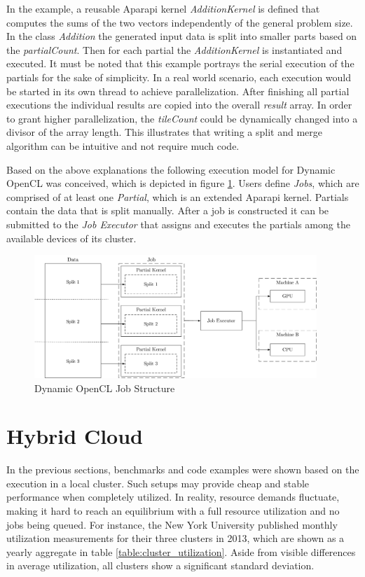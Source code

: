 In the example, a reusable Aparapi kernel \textit{AdditionKernel} is defined that computes the sums of the two vectors independently of the general problem size. In the class \textit{Addition} the generated input data is split into smaller parts based on the \textit{partialCount}. Then for each partial the \textit{AdditionKernel} is instantiated and executed. It must be noted that this example portrays the serial execution of the partials for the sake of simplicity. In a real world scenario, each execution would be started in its own thread to achieve parallelization. After finishing all partial executions the individual results are copied into the overall \textit{result} array. In order to grant higher parallelization, the \textit{tileCount} could be dynamically changed into a divisor of the array length. This illustrates that writing a split and merge algorithm can be intuitive and not require much code.

Based on the above explanations the following execution model for Dynamic OpenCL was conceived, which is depicted in figure \ref{img:dynamic_opencl_job}. Users define \textit{Jobs}, which are comprised of at least one \textit{Partial}, which is an extended Aparapi kernel. Partials contain the data that is split manually. After a job is constructed it can be submitted to the \textit{Job Executor} that assigns and executes the partials among the available devices of its cluster.

\begin{figure}[H]
	\includegraphics[width=0.95\textwidth]{drawings/dynamic_opencl_job.pdf}
	\centering
	\caption{Dynamic OpenCL Job Structure}
	\label{img:dynamic_opencl_job}
\end{figure}


\section{Hybrid Cloud}
\label{main_hybrid_cloud}
In the previous sections, benchmarks and code examples were shown based on the execution in a local cluster. Such setups may provide cheap and stable performance when completely utilized. In reality, resource demands fluctuate, making it hard to reach an equilibrium with a full resource utilization and no jobs being queued. For instance, the New York University published monthly utilization measurements for their three clusters in 2013\cite{nyu}, which are shown as a yearly aggregate in table \ref{table:cluster_utilization}. Aside from visible differences in average utilization, all clusters show a significant standard deviation.

